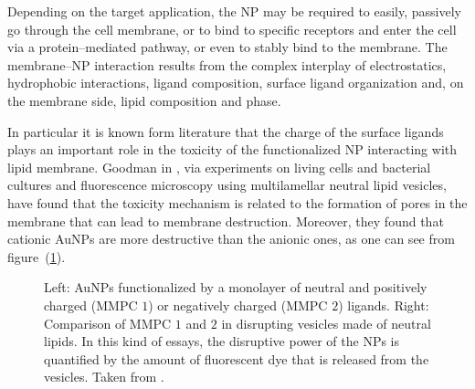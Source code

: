 Depending on the target application, the \ac{NP} may be required to easily, passively go through the cell 
membrane, or to bind to specific receptors and enter the cell via a protein--mediated pathway, or even to stably 
bind to the membrane. The membrane--\ac{NP} interaction results from the complex interplay of electrostatics, 
hydrophobic interactions, ligand composition, surface ligand organization and, on the membrane side, lipid 
composition and phase.

In particular it is known form literature that the charge of the surface ligands plays an important role in the 
toxicity of the functionalized \ac{NP} interacting with lipid membrane. Goodman \etal{} in \cite{Goodman2004}, via 
experiments on living cells and bacterial cultures and fluorescence microscopy using multilamellar neutral lipid 
vesicles, have found that the toxicity mechanism is related to the formation of pores in the membrane that can 
lead to membrane destruction. Moreover, they found that cationic \acp{AuNP} are more destructive than the anionic 
ones, as one can see from figure~(\ref{fig:goodman}).
\begin{figure}[ht]
	\centering
	\qquad\qquad%
	\caption{Left: \acp{AuNP} functionalized by a monolayer of neutral and positively charged (MMPC $1$) or negatively charged (MMPC $2$) ligands. Right: Comparison of MMPC $1$ and $2$ in disrupting vesicles made of neutral lipids. In this kind of essays, the disruptive power of the \acp{NP} is quantified by the amount of fluorescent dye that is released from the vesicles. Taken from \cite{Goodman2004}.}%
	\label{fig:goodman}
\end{figure}

